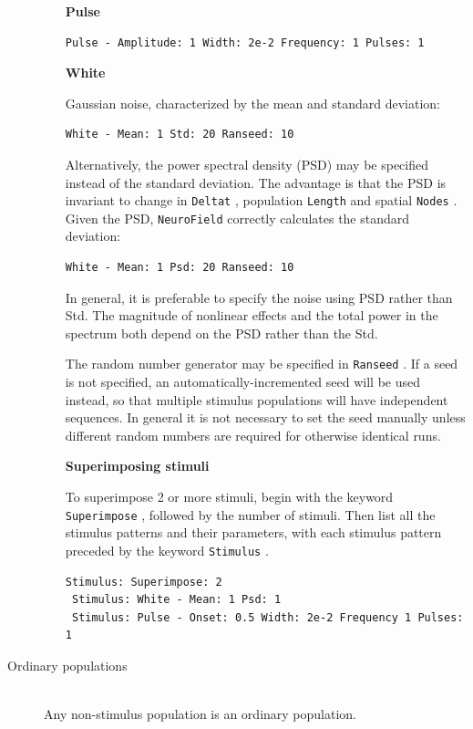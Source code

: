 \documentclass[12pt,a4paper]{article}
\newcommand{\type}[1]{ {\small\small\tt #1} }
\newcommand{\NF}[0]{ \type{NeuroField}}
\begin{document}
\begin{description}
\begin{itemize}
	\vspace{5mm}
	\textbf{Pulse}
	\begin{lstlisting}
Pulse - Amplitude: 1 Width: 2e-2 Frequency: 1 Pulses: 1
	\end{lstlisting}

	\vspace{5mm}
	\textbf{White}

	Gaussian noise, characterized by the mean and standard deviation:
	\begin{lstlisting}
White - Mean: 1 Std: 20 Ranseed: 10
	\end{lstlisting}

	Alternatively, the power spectral density (PSD) may be specified instead of the standard deviation. The advantage is that the PSD is invariant to change in \type{Deltat}, population \type{Length} and spatial \type{Nodes}. Given the PSD, \NF correctly calculates the standard deviation:
	\begin{lstlisting}
White - Mean: 1 Psd: 20 Ranseed: 10
	\end{lstlisting}
    
    In general, it is preferable to specify the noise using PSD rather than Std. The magnitude of nonlinear effects and the total power in the spectrum both depend on the PSD rather than the Std.

	The random number generator	may be specified in \type{Ranseed}. If a seed is not specified, an automatically-incremented seed will be used instead, so that multiple stimulus populations will have independent sequences. In general it is not necessary to set the seed manually unless different random numbers are required for otherwise identical runs. 

	\vspace{5mm}
	\textbf{Superimposing stimuli}

	To superimpose 2 or more stimuli, begin with the keyword \type{Superimpose}, followed by the number of stimuli. Then list all the stimulus patterns and their parameters, with each stimulus pattern preceded by the keyword \type{Stimulus}.
	\begin{lstlisting}
Stimulus: Superimpose: 2
 Stimulus: White - Mean: 1 Psd: 1
 Stimulus: Pulse - Onset: 0.5 Width: 2e-2 Frequency 1 Pulses: 1
	\end{lstlisting}

	\end{itemize}
\item[Ordinary populations]\ \\
	Any non-stimulus population is an ordinary population.


\end{description}
\end{document}
